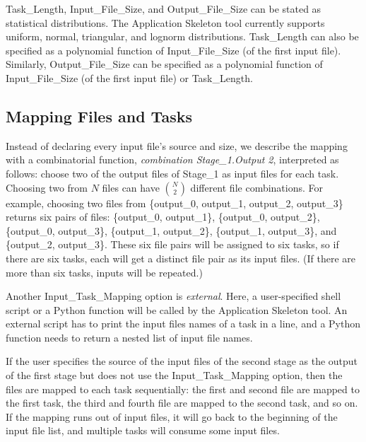 \documentclass[preprint,12pt]{elsarticle}
\newcommand{\katznote}[1]{ {\textcolor{blue}    { ***Dan:   #1 }}}
\newcommand{\zhaonote}[1]{{\textcolor{darkgreen}{ ***Zhao:  #1 }}}
\newcommand{\katznote}[1]{}
\newcommand{\zhaonote}[1]{}
\begin{document}
Task\_Length, Input\_File\_Size, and Output\_File\_Size can be stated as statistical distributions. The Application Skeleton tool currently supports uniform, normal, triangular, and lognorm distributions. Task\_Length 
can also be specified as a polynomial function of Input\_File\_Size (of the first input file). Similarly, Output\_File\_Size
can be specified as a polynomial function of Input\_File\_Size (of the first input file) or Task\_Length.


\subsection{Mapping Files and Tasks}

Instead of declaring every input file's source and size, we describe
the mapping with a combinatorial function,
{\it combination Stage\_1.Output 2},
 interpreted as follows: choose two of the output files of Stage\_1 as input files for each task.
Choosing two from $N$ files can have $N \choose 2$ different file combinations. 
For example, choosing two files from \{output\_0, output\_1, output\_2, output\_3\} returns six pairs of files: 
\{output\_0, output\_1\}, \{output\_0, output\_2\}, \{output\_0, output\_3\}, \{output\_1, output\_2\}, \{output\_1, output\_3\}, and \{output\_2, output\_3\}.
These six file pairs will be assigned to six tasks, so if there are six tasks, each will get a distinct file pair as its input files. (If there are more than six tasks, inputs will be repeated.)

Another Input\_Task\_Mapping option is {\it external}. Here, a user-specified
shell script or a Python function will be called by the Application Skeleton tool. An external script
has to print the input files names of a task in a line, and a Python function needs to return a nested
list of input file names.

If the user specifies the source of the input files of the second stage as the output of the first stage
but does not use the Input\_Task\_Mapping option, then the files are mapped to each task sequentially: the first and second file are mapped to the first task, the third and fourth file are mapped
to the second task, and so on. If the mapping runs out of input files, it will go back to the beginning
of the input file list, and multiple tasks will consume some input files.
\end{document}
